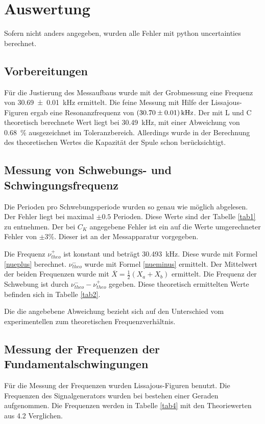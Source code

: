 \documentclass[11pt,ngerman,a4paper]{article}
\begin{document}
\section{Auswertung}


Sofern nicht anders angegeben, wurden alle Fehler mit python uncertainties berechnet.
\subsection{Vorbereitungen}
Für die Justierung des Messaufbaus wurde mit der Grobmessung eine Frequenz von \SI{30,69+-0,01}{\kilo\hertz} ermittelt. Die feine Messung mit Hilfe der Lissajous-Figuren ergab eine Resonanzfrequenz von $\SI{30,70+-0,01}{\kilo\hertz}$. Der mit L und C theoretisch berechnete Wert liegt bei \SI{30,49}{\kilo\hertz}, mit einer Abweichung von \SI{0,68}{\percent} ausgezeichnet im Toleranzbereich. Allerdings wurde in der Berechnung des theoretischen Wertes die Kapazität der Spule schon berücksichtigt.
\subsection{Messung von Schwebungs- und Schwingungsfrequenz}
Die Perioden pro Schwebungsperiode wurden so genau wie möglich abgelesen. Der Fehler liegt bei maximal $\pm 0.5$ Perioden. Diese Werte sind der Tabelle \ref{tab1} zu entnehmen. Der bei $C_K$ angegebene Fehler ist ein auf die Werte umgerechneter Fehler von $\pm 3 \%$. Dieser ist an der Messapparatur vorgegeben.

\noindent
Die Frequenz $\nu_{theo}^+$ ist konstant und beträgt \SI{30,493}{\kHz}. Diese wurde mit Formel \ref{nueplus} berechnet.  $\nu_{theo}^-$ wurde mit Formel \ref{nueminus} ermittelt. Der Mittelwert der beiden Frequenzen wurde mit $\overline{X}=\frac{1}{2}(X_a+X_b)$ ermittelt. Die Frequenz der Schwebung ist durch $\nu_{theo}^--\nu_{theo}^+$ gegeben. Diese theoretisch ermittelten Werte befinden sich in Tabelle \ref{tab2}.



\noindent
Die die angebebene Abweichung bezieht sich auf den Unterschied vom experimentellen zum theoretischen Frequenzverhältnis.
\subsection{Messung der Frequenzen der Fundamentalschwingungen}
Für die Messung der Frequenzen wurden Lissajous-Figuren benutzt. Die Frequenzen des Signalgenerators wurden bei bestehen einer Geraden aufgenommen. Die Frequenzen werden in Tabelle \ref{tab4} mit den Theoriewerten aus 4.2 Verglichen.
\end{document}
